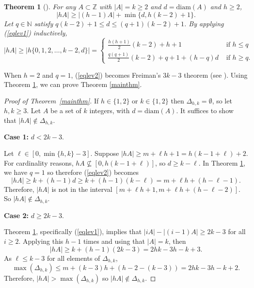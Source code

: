 \documentclass[10pt,a4paper]{article}
\newtheorem{theorem}{Theorem}
\theoremstyle{definition}
\theoremstyle{remark}
\numberwithin{equation}{section}
\numberwithin{theorem}{section}
\newcommand{\N}{\mathbb{N}}
\newcommand{\Z}{\mathbb{Z}}
\newcommand{\diam}{\mathrm{diam}}
\begin{document}
\begin{theorem}[\cite{Lev96}]\label{thmlev}
    For any $A \subset \Z$ with $|A|=k\geq 2$ and $d = \diam(A)$ and $h \geq 2$, \begin{equation}\label{eqlev1}
        |hA| \geq |(h-1)A| + \min\{d,h(k-2)+1\}.
    \end{equation} Let $q \in \N$ satisfy $q(k-2)+ 1 \leq d \leq (q+1)(k-2)+1$. By applying (\ref{eqlev1}) inductively, \begin{equation}\label{eqlev2}
        |hA| \geq |h\{0,1,2,\ldots,k-2,d\}| = \begin{cases}
       \frac{h(h+1)}{2}(k-2)+h+1 &\text{ if } h \leq q \\
        \frac{q(q+1)}{2}(k-2)+q+1 + (h-q)d &\text{ if } h \geq q.
    \end{cases}
    \end{equation}
\end{theorem}

When $h=2$ and $q=1$, (\ref{eqlev2}) becomes Freiman's $3k-3$ theorem (see \cite[Theorem 1.13]{Nathanson96}). Using Theorem \ref{thmlev}, we can prove Theorem \ref{mainthm}.

\begin{proof}[Proof of Theorem~\ref{mainthm}]
    If $h \in \{1,2\}$ or $k \in \{1,2\}$ then $\Delta_{h,k} = \emptyset$, so let $h,k \geq 3$. Let $A$ be a set of $k$ integers, with $d = \diam(A)$. It suffices to show that $|hA| \not \in \Delta_{h,k}$.

    \textbf{Case 1:} $d < 2k-3$.

    Let $\ell \in [0,\min\{h,k\}-3]$. Suppose $|hA| \geq m+\ell h+1 = h(k-1 +\ell)+2$. For cardinality reasons, $hA \not \subseteq [0,h(k-1+\ell)]$, so $d \geq k-\ell$. In Theorem \ref{thmlev}, we have $q = 1$ so therefore (\ref{eqlev2}) becomes \[|hA| \geq k+(h-1)d \geq k + (h-1)(k-\ell) = m+\ell h+(h-\ell-1).\] Therefore, $|hA|$ is not in the interval $[m+\ell h+1,m+ \ell h+(h-  \ell-2)]$. So $|hA| \not \in \Delta_{h,k}$.

    \textbf{Case 2:} $d \geq 2k-3$.

    Theorem \ref{thmlev}, specifically (\ref{eqlev1}), implies that $|iA| -|(i-1)A| \geq  2k-3$ for all $i \geq 2$. Applying this $h-1$ times and using that $|A| = k$, then \begin{equation}\label{eqboundhA}
        |hA| \geq k + (h-1)(2k-3) = 2hk-3h-k+3. 
    \end{equation} As $\ell \leq k-3$ for all elements of $\Delta_{h,k}$, \[\max(\Delta_{h,k}) \leq m+(k-3) h + (h-2-(k-3)) = 2hk-3h-k+2.\]
    Therefore, $|hA| > \max(\Delta_{h,k})$ so $|hA|\not \in \Delta_{h,k}$. 
\end{proof}
\end{document}
